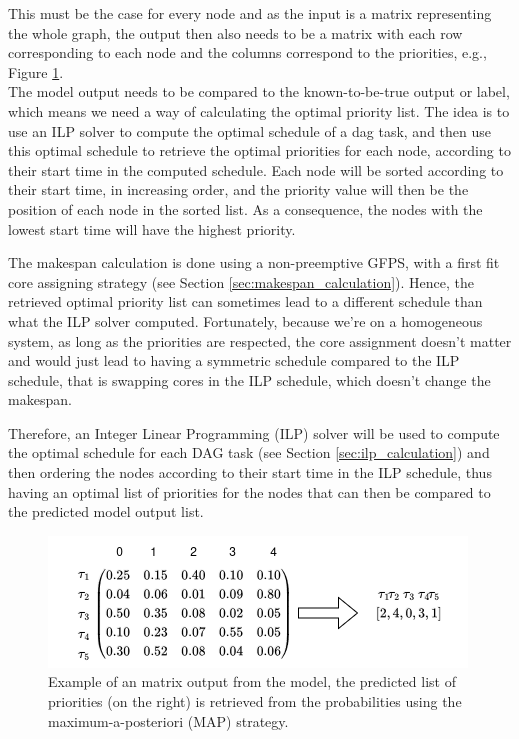 This must be the case for every node and as the input 
is a matrix representing the whole graph, 
the output then also needs to be a matrix with 
each row corresponding to each node and the columns
correspond to the priorities, e.g., Figure \ref{fig:dag_output_matrix_example}.
\\

The model output needs to be compared to the known-to-be-true output or label,
which means we need a way of calculating the optimal priority list.
The idea is to use an ILP solver to compute the optimal schedule 
of a dag task, and then use this optimal schedule to retrieve 
the optimal priorities for each node, according to their start time
in the computed schedule.
Each node will be sorted according to their start time, in increasing order,
and the priority value will then be the position of each node in the sorted list.
As a consequence, the nodes with the lowest start time will
have the highest priority.

The makespan calculation is done using a non-preemptive GFPS,
with a first fit core assigning strategy (see Section \ref{sec:makespan_calculation}). Hence,
the retrieved optimal priority list can sometimes 
lead to a different schedule than what the ILP solver computed.
Fortunately, because we're on a homogeneous system,
as long as the priorities are respected, the core assignment 
doesn't matter and would just lead to having a symmetric schedule
compared to the ILP schedule,
that is swapping cores in the ILP schedule, which doesn't change the makespan.

Therefore, an Integer Linear Programming (ILP) solver will be used to compute
the optimal schedule for each DAG task (see Section \ref{sec:ilp_calculation}) and then
ordering the nodes according to their start time in the ILP schedule,
thus having an optimal list of priorities for the nodes that can then be compared to
the predicted model output list.

\begin{figure}
    \centering
    \includegraphics[width=\linewidth]{images/output_matrix_example.drawio.png}
    \caption{Example of an matrix output from the model, the predicted list of priorities (on the right)
    is retrieved from the probabilities using the maximum-a-posteriori (MAP) strategy.}
    \label{fig:dag_output_matrix_example}
\end{figure}

